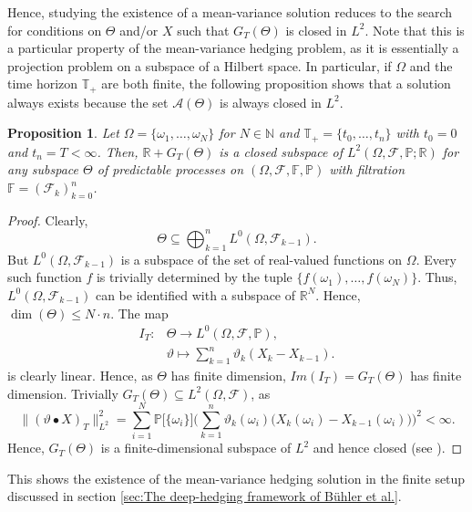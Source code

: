 \documentclass[11pt,a4paper,twoside,openany]{report}
\numberwithin{equation}{section}
\theoremstyle{plain} %
\newtheorem{proposition}[theorem]{Proposition}
\theoremstyle{definition} %
\theoremstyle{remark} %
\let\parencite\authnumparencite
\begin{document}
Hence, studying the existence of a mean-variance solution reduces to the search for conditions on \(\Theta\) and/or \(X\) such that \(G_T(\Theta)\) is closed in \(L^2\). Note that this is a particular property of the mean-variance hedging problem, as it is essentially a projection problem on a subspace of a Hilbert space. In particular, if \(\Omega\) and the time horizon \(\mathbb{T}_+\) are both finite, the following proposition shows that a solution always exists because the set \(\mathcal{A}(\Theta)\) is always closed in \(L^2\).
\begin{proposition}\label{prop:existence of finite deep mean variance solution}
    Let \(\Omega=\{\omega_1,\dots,\omega_N\}\) for \(N\in\mathbb{N}\) and \(\mathbb{T}_+=\{t_0,\dots,t_n\}\) with \(t_0=0\) and \(t_n=T<\infty\). Then, \(\mathbb{R}+G_T(\Theta)\) is a closed subspace of \(L^2(\Omega,\mathcal{F},\mathbb{P};\mathbb{R})\) for any subspace \(\Theta\) of predictable processes on \((\Omega,\mathcal{F},\mathbb{F},\mathbb{P})\) with filtration \(\mathbb{F}=(\mathcal{F}_k)_{k=0}^{n}\).
\end{proposition}
\begin{proof}
    Clearly, 
    \begin{equation*}
        \Theta\subseteq\bigoplus_{k=1}^{n} L^0(\Omega,\mathcal{F}_{k-1}).
    \end{equation*}
    But \( L^0(\Omega,\mathcal{F}_{k-1})\) is a subspace of the set of real-valued functions on \(\Omega\). Every such function \(f\) is trivially determined by the tuple \(\{f(\omega_1),\dots,f(\omega_N)\}\). Thus, \( L^0(\Omega,\mathcal{F}_{k-1})\) can be identified with a subspace of \(\mathbb{R}^N\). Hence, \(\dim(\Theta)\leq N\cdot n\). The map 
    \begin{align*}
        I_T:&\Theta\to  L^0(\Omega,\mathcal{F},\mathbb{P}),
        \\&\vartheta\mapsto\sum_{k=1}^n\vartheta_k(X_{k}-X_{k-1}).
    \end{align*}
    is clearly linear. Hence, as \(\Theta\) has finite dimension, \(Im(I_T)=G_T(\Theta)\) has finite dimension. Trivially \(G_T(\Theta)\subseteq L^2(\Omega,\mathcal{F})\), as 
    \begin{equation}\label{eq:L2 norm in finite setup is double sum}
        \lVert (\vartheta\bullet X)_T\rVert_{L^2}^2=\sum_{i=1}^N\mathbb{P}\big[\{\omega_i\}\big]\bigg(\sum_{k=1}^n\vartheta_k(\omega_i)\big(X_k(\omega_i)-X_{k-1}(\omega_i)\big)\bigg)^2<\infty.
    \end{equation}
    Hence, \(G_T(\Theta)\) is a finite-dimensional subspace of \(L^2\) and hence closed (see \parencite[Cor.~1.22]{Buehler2018DeepHedging}).
\end{proof}
This shows the existence of the mean-variance hedging solution in the finite setup discussed in section \ref{sec:The deep-hedging framework of Bühler et al.}.
\end{document}
